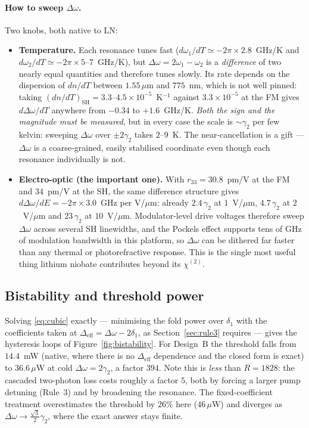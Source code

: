 \documentclass[11pt,a4paper]{article}
\newcommand{\chitwo}{\chi^{(2)}}
\newcommand{\Dom}{\Delta\omega}
\begin{document}
\paragraph{How to sweep $\Dom$.}  Two knobs, both native to LN:
\begin{itemize}[leftmargin=1.6em,itemsep=2pt]
\item \textbf{Temperature.}  Each resonance tunes fast
  ($d\omega_1/dT\simeq-2\pi\times2.8$~GHz/K and
  $d\omega_2/dT\simeq-2\pi\times5$--$7$~GHz/K), but $\Dom=2\omega_1-\omega_2$
  is a \emph{difference} of two nearly equal quantities and therefore
  tunes slowly.  Its rate depends on the dispersion of $dn/dT$ between
  $1.55\,\mu$m and $775$~nm, which is not well pinned: taking
  $(dn/dT)_{\text{SH}}=3.3$--$4.5\times10^{-5}$~K$^{-1}$ against
  $3.3\times10^{-5}$ at the FM gives
  $d\Dom/dT$ anywhere from $-0.34$ to $+1.6$~GHz/K.  \emph{Both the sign
  and the magnitude must be measured}, but in every case the scale is
  $\sim\gamma_2$ per few kelvin: sweeping $\Dom$ over $\pm2\gamma_2$
  takes $2$--$9$~K.  The near-cancellation is a gift --- $\Dom$ is a
  coarse-grained, easily stabilised coordinate even though each
  resonance individually is not.
\item \textbf{Electro-optic (the important one).}  With $r_{33}=30.8$~pm/V
  at the FM and $34$~pm/V at the SH, the same difference structure gives
  $d\Dom/dE=-2\pi\times3.0$~GHz per V/$\mu$m: already $2.4\,\gamma_2$ at
  $1$~V/$\mu$m, $4.7\,\gamma_2$ at $2$~V/$\mu$m and $23\,\gamma_2$ at
  $10$~V/$\mu$m.  Modulator-level drive voltages therefore sweep $\Dom$
  across several SH linewidths, and the Pockels effect supports tens of
  GHz of modulation bandwidth in this platform, so $\Dom$ can be dithered
  far faster than any thermal or photorefractive response.  This is the
  single most useful thing lithium niobate contributes beyond its
  $\chitwo$.
\end{itemize}

\subsection{Bistability and threshold power}\label{sec:bist}

Solving \eqref{eq:cubic} exactly --- minimising the fold power over
$\delta_1$ with the coefficients taken at
$\Delta_{\text{eff}}=\Dom-2\delta_1$, as Section~\ref{sec:rule3}
requires --- gives the hysteresis loops of
Figure~\ref{fig:bistability}.  For Design~B the threshold falls from
$14.4$~mW (native, where there is no $\Delta_{\text{eff}}$ dependence and
the closed form is exact) to $36.6\,\mu$W at cold $\Dom=2\gamma_2$, a
factor $394$.  Note this is \emph{less} than $R=1828$: the cascaded
two-photon loss costs roughly a factor $5$, both by forcing a larger
pump detuning (Rule~3) and by broadening the resonance.  The
fixed-coefficient treatment overestimates the threshold by $26\%$ here
($46\,\mu$W) and diverges as $\Dom\to\tfrac{\sqrt3}{2}\gamma_2$, where
the exact answer stays finite.
\end{document}
